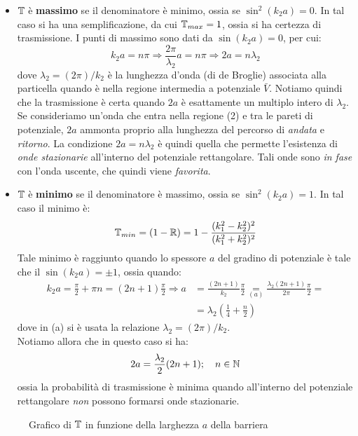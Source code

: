 \documentclass[../../FisicaTeorica.tex]{subfiles}
\begin{document}
\begin{itemize}
\item $\mathbb{T}$ è \textbf{massimo} se il denominatore è minimo, ossia se $\sin^2 (k_2 a) =0$. In tal caso si ha una semplificazione, da cui $\mathbb{T}_{max}=1$, ossia si ha certezza di trasmissione. I punti di massimo sono dati da $\sin(k_2 a)=0$, per cui:
\[
k_2 a= n\pi \Rightarrow \frac{2\pi}{\lambda_2} a=n\pi\Rightarrow  2a=n\lambda_2
\]
dove $\lambda_2 = (2\pi)/k_2$ è la lunghezza d'onda (di de Broglie) associata alla particella quando è nella regione intermedia a potenziale $\bar{V}$. Notiamo quindi che la trasmissione è certa quando $2a$ è esattamente un multiplo intero di $\lambda_2$. Se consideriamo un'onda che entra nella regione (2) e  tra le pareti di potenziale, $2a$ ammonta proprio alla lunghezza del percorso di \textit{andata} e \textit{ritorno}. La condizione $2a=n\lambda_2$ è quindi quella che permette l'esistenza di \textit{onde stazionarie} all'interno del potenziale rettangolare. Tali onde sono \textit{in fase} con l'onda uscente, che quindi viene \textit{favorita}.
 \item $\mathbb{T}$ è \textbf{minimo} se il denominatore è massimo, ossia se $\sin^2 (k_2 a)=1$. In tal caso il minimo è:
\begin{equation}
\mathbb{T}_{min}=(1-\mathbb{R})=1-\frac{(k_1^2-k_2^2)^2}{(k_1^2+k_2^2)^2}
\label{eqn:Tmin}
\end{equation}
Tale minimo è raggiunto quando lo spessore $a$ del gradino di potenziale è tale che il $\sin(k_2 a)=\pm 1$, ossia quando:
\begin{align*}
k_2 a=\frac{\pi}{2}+\pi n=(2n+1)\frac{\pi}{2}\Rightarrow a&=\frac{(2n+1)}{k_2}\frac{\pi}{2}\underset{(a)}{=}\frac{\lambda_2(2n+1)}{2\pi}\frac{\pi}{2}=\\
&=\lambda_2 \left(\frac{1}{4}+\frac{n}{2}\right)
\end{align*}
dove in (a) si è usata la relazione $\lambda_2=(2\pi)/k_2$.\\ Notiamo allora che in questo caso si ha:
\[
2a=\frac{\lambda_2}{2}(2n+1); \quad n\in \mathbb{N}
\]
ossia la probabilità di trasmissione è minima quando all'interno del potenziale rettangolare \textit{non} possono formarsi onde stazionarie. 
\end{itemize}
\begin{figure}[H]
\centering

\caption{Grafico di $\mathbb{T}$ in funzione della larghezza $a$ della barriera}
\label{plot:Ta}
\end{figure}
\end{document}
